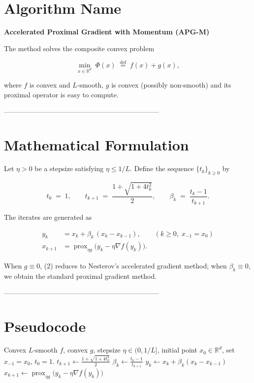 \documentclass{article}
\newcommand{\prox}{\operatorname{prox}}
\newcommand{\R}{\mathbb{R}}
\begin{document}
\section*{Algorithm Name}
\textbf{Accelerated Proximal Gradient with Momentum (APG-M)}  

The method solves the composite convex problem  

\[
\min_{x\in\R^{d}} \; \Phi(x)\;\stackrel{\text{def}}{=}\; f(x)+g(x),
\]

where $f$ is convex and $L$‑smooth, $g$ is convex (possibly non‑smooth) and its proximal operator is easy to compute.

--------------------------------------------------------------------

\section*{Mathematical Formulation}
Let $\eta>0$ be a stepsize satisfying $\eta\le 1/L$.  
Define the sequence $\{t_k\}_{k\ge 0}$ by  

\[
t_0\;=\;1,\qquad 
t_{k+1}\;=\;\frac{1+\sqrt{1+4t_k^{2}}}{2}, \qquad 
\beta_k\;=\;\frac{t_k-1}{t_{k+1}} .
\tag{1}
\]

The iterates are generated as  

\[
\boxed{
\begin{aligned}
y_k &= x_k + \beta_k\,(x_k-x_{k-1}), \qquad (k\ge 0,\;x_{-1}=x_0)\\[4pt]
x_{k+1} &= \prox_{\eta g}\bigl(y_k-\eta\nabla f(y_k)\bigr).
\end{aligned}}
\tag{2}
\]

When $g\equiv0$, (2) reduces to Nesterov’s accelerated gradient method; when $\beta_k\equiv0$, we obtain the standard proximal gradient method.

--------------------------------------------------------------------

\section*{Pseudocode}
\begin{algorithm}[H]
\caption{Accelerated Proximal Gradient with Momentum (APG-M)}
\begin{algorithmic}[1]
\Require Convex $L$‑smooth $f$, convex $g$, stepsize $\eta\in(0,1/L]$, initial point $x_0\in\R^d$, set $x_{-1}=x_0$, $t_0=1$.
    \State $t_{k+1}\gets \frac{1+\sqrt{1+4t_k^{2}}}{2}$ \hfill{}
    \State $\beta_k \gets \frac{t_k-1}{t_{k+1}}$
    \State $y_k \gets x_k + \beta_k (x_k-x_{k-1})$
    \State $x_{k+1} \gets \prox_{\eta g}\bigl(y_k-\eta\nabla f(y_k)\bigr)$
\EndFor
\end{algorithmic}
\end{algorithm}
\end{document}
